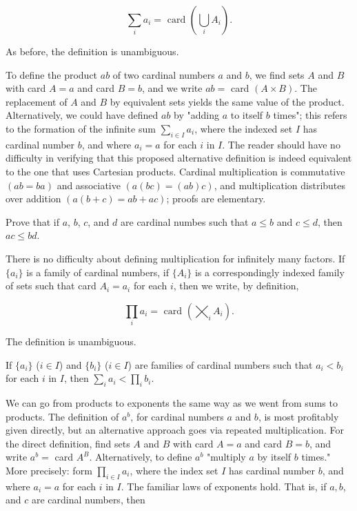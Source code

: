 \begin{equation*}
\sum_{i} a_{i} = \text{ card } (\bigcup_{i} A_{i} ).
\end{equation*}

As before, the definition is unambiguous.

To define the product $ab$ of two cardinal numbers $a$ and $b$, we find sets $A$ and $B$ with card $A = a$ and card $B = b$, and we write $ab =$ card $(A \times B)$. The replacement of $A$ and $B$ by equivalent sets yields the same value of the product. Alternatively, we could have defined $ab$ by "adding $a$ to itself $b$ times"; this refers to the formation of the infinite sum $\sum_{i \in I} a_{i}$, where the indexed set $I$ has cardinal number $b$, and where $a_{i} = a$ for each $i$ in $I$. The reader should have no difficulty in verifying that this proposed alternative definition is indeed equivalent to the one that uses Cartesian products. Cardinal multiplication is commutative $(ab = ba)$ and associative $(a(bc) = (ab)c)$, and multiplication distributes over addition $(a(b + c) = ab + ac)$; proofs are elementary. 

\begin{exercise} Prove that if $a$, $b$, $c$, and $d$ are cardinal numbes such that $a \le b$ and $c \le d$, then $ac \le bd$.
\end{exercise}

There is no difficulty about defining multiplication for infinitely many factors. If $\{ a_{i} \}$ is a family of cardinal numbers, if $\{ A_{i} \}$ is a correspondingly indexed family of sets such that card $A_{i} = a_{i}$ for each $i$, then we write, by definition, 

\begin{equation*}
\prod_{i} a_{i} = \text{ card } ( \bigtimes_{i} A_{i} ).
\end{equation*}

The definition is unambiguous. 

\begin{exercise} If $\{ a_{i} \}$ ($i \in I$) and $\{ b_{i} \}$ ($i \in I$) are families of cardinal numbers such that $a_{i} < b_{i}$ for each $i$ in $I$, then $\sum_{i}a_{i} < \prod_{i}b_{i}$. 
\end{exercise}

We can go from products to exponents the same way as we went from sums to products. The definition of $a^{b}$, for cardinal numbers $a$ and $b$, is most profitably given directly, but an alternative approach goes via repeated multiplication. For the direct definition, find sets $A$ and $B$ with card $A = a$ and card $B = b$, and write $a^{b} =$ card $A^{B}$. Alternatively, to define $a^{b}$ "multiply $a$ by itself $b$ times." More precisely: form $\prod_{i \in I} a_{i}$, where the index set $I$ has cardinal number $b$, and where $a_{i} = a$ for each $i$ in $I$. The familiar laws of exponents hold. That is, if $a, b$, and $c$ are cardinal numbers, then 

